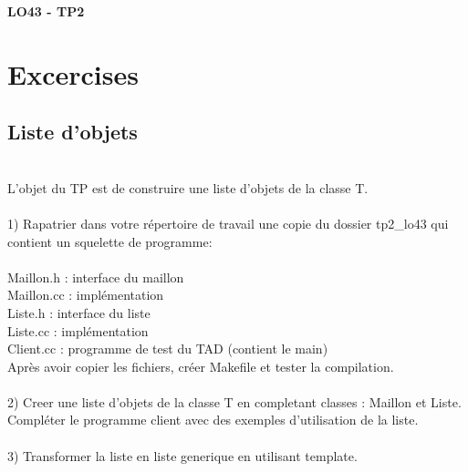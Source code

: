 \documentclass[a4paper,11pt]{article}
\begin{document}

\begin{center}
\bfseries\Huge{LO43 - TP2}
\end{center}

	
	

\section{Excercises}



\subsection{Liste d'objets}
~\\
	L'objet du TP est de construire une liste d'objets de la classe T.\\
~\\			
	1) Rapatrier dans votre r\'epertoire de travail  une copie du dossier tp2\_lo43 qui contient
un squelette de programme:\\
~\\
	Maillon.h : interface du maillon\\
	Maillon.cc : impl\'ementation\\
	Liste.h : interface du liste\\
	Liste.cc : impl\'ementation\\
	Client.cc : programme de test du TAD (contient le main)\\
	
	Apr\`es avoir copier les fichiers, cr\'eer Makefile et tester la compilation.\\
~\\
	2) Creer une liste d'objets de la classe T en completant classes : Maillon et Liste. Compl\'eter le programme client avec des exemples d'utilisation de la liste.
~\\
~\\
	3) Transformer la liste en liste generique en utilisant template.\\ %
~\\	
			
			
\end{document}
